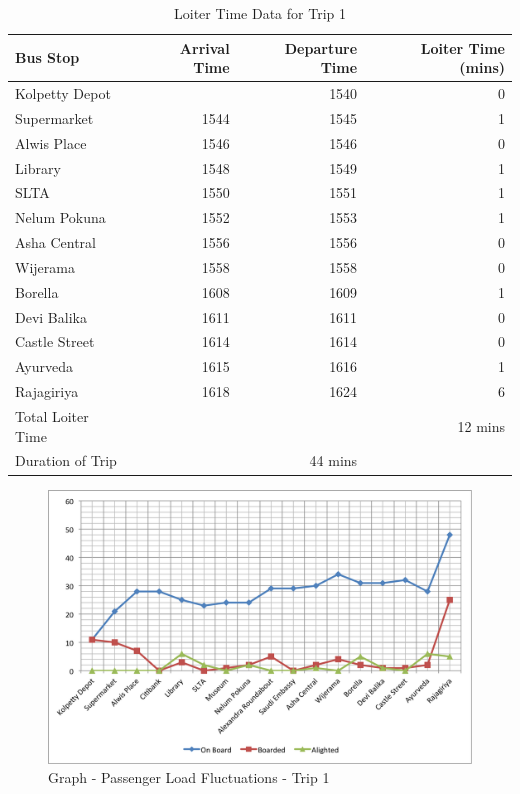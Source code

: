 \documentclass[12pt, oneside]{report}
\begin{document}
\begin{itemize}
\begin{table}[h!]
\centering
\begin{tabular}{|l|r|r|r|}
\hline
Bus Stop & Arrival Time & Departure Time & Loiter Time (mins) \\
\hline
Kolpetty Depot	&	&1540	&0\\
Supermarket	&1544	&1545	&1\\
Alwis Place	&1546	&1546	&0\\
Library	&1548	&1549	&1\\
SLTA	&1550	&1551	&1\\
Nelum Pokuna	&1552	&1553	&1\\
Asha Central	&1556	&1556	&0\\
Wijerama	&1558	&1558	&0\\
Borella	&1608	&1609	&1\\
Devi Balika	&1611	&1611	&0\\
Castle Street	&1614	&1614	&0\\
Ayurveda	&1615	&1616	&1\\
Rajagiriya	&1618	&1624	&6\\
\hline
Total Loiter Time & & & 12 mins \\
Duration of Trip & & 44 mins & \\
\hline
\end{tabular}
\caption{Loiter Time Data for Trip 1}
\label{table-trip1-LoiterTime}
\end{table}

\begin {figure} [h!]
\centering
\includegraphics[scale=0.7]{passengerLoadData-Trip1}
\caption [Graph - Passenger Load Fluctuations - Trip 1] {Graph - Passenger Load Fluctuations - Trip 1}
\label {image-passengerLoadData-Trip1}
\end {figure}


\end{itemize}
\end{document}
